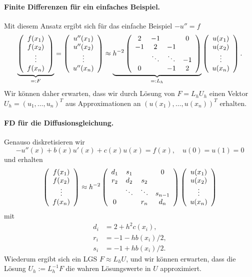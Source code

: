 \documentclass[12pt,a4paper]{book}
\theoremstyle{break}
\theoremstyle{nonumberplain}
\newcommand{\1}{\mathbbm{1}} 			      	%
\begin{document}
\paragraph{Finite Differenzen für ein einfaches Beispiel.}
Mit diesem Ansatz ergibt sich für das einfache Beispiel $-u''=f$ 
\[
\underbrace{\left( \begin{array}{c} f(x_1)\\ f(x_2)\\ \vdots \\ f(x_{n}) \end{array}\right)}_{=:F}
= \left( \begin{array}{c} u''(x_1)\\ u''(x_2)\\ \vdots \\ u''(x_{n}) \end{array}\right)
\approx \underbrace{h^{-2} \left( \begin{array}{c c c c} 2 & -1 &  & 0\\ -1 & 2 & -1 \\ & \ddots & \ddots & -1\\ 0 & & -1 & 2\end{array}\right)}_{=:L_h}
\left( \begin{array}{c} u(x_1)\\ u(x_2)\\ \vdots \\ u(x_{n}) \end{array}\right).
\]
Wir können daher erwarten, dass wir durch Lösung von $F=L_h U_h$ einen
Vektor $U_h=(u_1,\ldots,u_{n})^T$ aus Approximationen an $(u(x_1),\ldots,u(x_{n}))^T$
erhalten.

\paragraph{FD für die Diffusionsgleichung.}
Genauso diskretisieren wir
\[
-u''(x) + b(x)u'(x) + c(x)u(x)=f(x), \quad u(0)=u(1)=0
\]
und erhalten
\[
\left( \begin{array}{c} f(x_1)\\ f(x_2)\\ \vdots \\ f(x_{n}) \end{array}\right)
\approx h^{-2} \left( \begin{array}{c c c c} d_1 & s_1 &  & 0\\ r_2 & d_2 & s_2 \\ & \ddots & \ddots & s_{n-1}\\ 0  &  & r_{n} & d_{n}\end{array}\right) 
\left( \begin{array}{c} u(x_1)\\ u(x_2)\\ \vdots \\ u(x_{n}) \end{array}\right)
\]
mit
\begin{align*}
d_i&=2+h^2 c(x_i),\\
r_i&=-1-hb(x_i)/2,\\
s_i&=-1+hb(x_i)/2.
\end{align*}
Wiederum ergibt sich ein LGS $F\approx L_h U$, und wir können erwarten, dass die
Lösung $U_h:=L_h^{-1} F$ die wahren Lösungswerte in $U$ approximiert.
\end{document}

